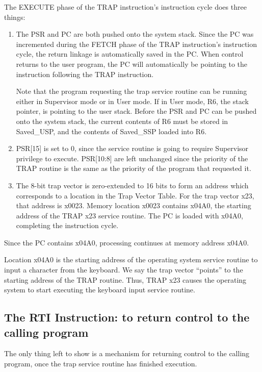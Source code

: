 \documentclass{patt}
\begin{document}
The EXECUTE phase of the TRAP instruction's instruction cycle does
three things:
\begin{enumerate} 
\item The PSR and PC are both pushed onto the system stack.  Since the PC was 
  incremented during the FETCH phase of the TRAP instruction's instruction 
  cycle, the return linkage is automatically saved in the PC.  When control
  returns to the user program, the PC will automatically be pointing to the
  instruction following the TRAP instruction.


  Note that the program requesting the trap service routine
  can be running either in Supervisor mode or in User mode.  If in User mode, 
  R6, the stack pointer, is pointing to the user stack.  Before the PSR and PC 
  can be pushed onto the system stack, the current contents of R6 must be 
  stored in Saved\_USP, and the contents of Saved\_SSP loaded into R6.

\item PSR[15] is set to 0, since the service routine is going to require 
  Supervisor privilege to execute.  PSR[10:8] are left unchanged since the 
  priority of the TRAP routine is the same as the priority of the program 
  that requested it.

\item The 8-bit trap vector is zero-extended to 16 bits to form an
  address which corresponds to a location in the Trap Vector Table.  
  For the trap vector x23, that address is x0023.  Memory location x0023
  contains x04A0, the starting address of the TRAP x23 service routine. 
  The PC is loaded with x04A0, completing the instruction cycle.
\end{enumerate}

Since the PC contains x04A0, processing continues at memory
address x04A0.

Location x04A0 is the starting address of the operating system service
routine to input a character from the keyboard.  We say the trap
vector ``points'' to the starting address of the TRAP routine.  Thus,
TRAP x23 causes the operating system to start executing the keyboard
input service routine.

\subsection{The RTI Instruction: to return control to the calling program}

The only thing left to show is a mechanism for returning control to the 
calling program, once the trap service routine has finished execution.
\end{document}
